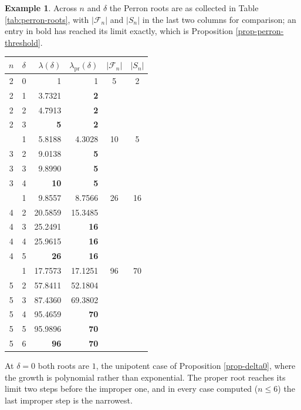 \documentclass[11pt, a4paper, abstract=yes]{scrartcl}
\theoremstyle{definition}
\newtheorem{mexample}[definition]{Example}
\theoremstyle{remark}
\theoremstyle{plain}
\begin{document}
\begin{mexample}
Across \(n\) and \(\delta\) the Perron roots are as collected in Table \ref{tab:perron-roots},
with \(\lvert\mathcal F_n\rvert\) and \(\lvert S_n\rvert\) in the last two columns for
comparison; an entry in bold has reached its limit exactly, which is
Proposition \ref{prop-perron-threshold}.
\begingroup\small
\begin{center}
\begin{tabular}{@{}cc rr cc@{}}
  \toprule
  \(n\) & \(\delta\) & \(\lambda(\delta)\) & \(\lambda_{\mathrm{pr}}(\delta)\)
        & \(\lvert\mathcal F_n\rvert\) & \(\lvert S_n\rvert\)\\
  \midrule
  2 & 0 & 1 & 1 & 5 & 2\\
  2 & 1 & 3.7321 & \textbf{2} & &\\
  2 & 2 & 4.7913 & \textbf{2} & &\\
  2 & 3 & \textbf{5} & \textbf{2} & &\\
  \addlinespace
  3 & 1 & 5.8188 & 4.3028 & 10 & 5\\
  3 & 2 & 9.0138 & \textbf{5} & &\\
  3 & 3 & 9.8990 & \textbf{5} & &\\
  3 & 4 & \textbf{10} & \textbf{5} & &\\
  \addlinespace
  4 & 1 & 9.8557 & 8.7566 & 26 & 16\\
  4 & 2 & 20.5859 & 15.3485 & &\\
  4 & 3 & 25.2491 & \textbf{16} & &\\
  4 & 4 & 25.9615 & \textbf{16} & &\\
  4 & 5 & \textbf{26} & \textbf{16} & &\\
  \addlinespace
  5 & 1 & 17.7573 & 17.1251 & 96 & 70\\
  5 & 2 & 57.8411 & 52.1804 & &\\
  5 & 3 & 87.4360 & 69.3802 & &\\
  5 & 4 & 95.4659 & \textbf{70} & &\\
  5 & 5 & 95.9896 & \textbf{70} & &\\
  5 & 6 & \textbf{96} & \textbf{70} & &\\
  \bottomrule
\end{tabular}
\label{tab:perron-roots}
\end{center}
\endgroup
At \(\delta=0\) both roots are \(1\), the unipotent case of Proposition \ref{prop-delta0}, where the
growth is polynomial rather than exponential. The proper root reaches its limit two steps before the
improper one, and in every case computed (\(n\le6\)) the last improper step is the narrowest.
\label{mex-recurrences}
\end{mexample}
\end{document}
